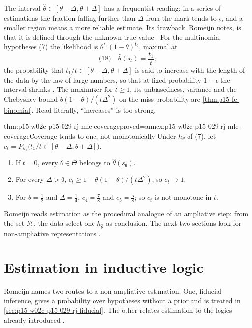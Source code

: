 The interval \(\hat\theta\in[\theta-\Delta,\theta+\Delta]\) has a
frequentist reading: in a series of estimations the fraction falling
further than \(\Delta\) from the mark tends to \(\epsilon\), and a
smaller region means a more reliable estimate. Its drawback, Romeijn
notes, is that it is defined through the unknown true value
\cite[p.~643]{Romeijn2011InductiveLogicStatistics}. For the multinomial
hypotheses (7) the likelihood is \(\theta^{t_1}(1-\theta)^{t_0}\),
maximal at
\[
 \text{(18)}\quad \hat\theta(s_t)=\frac{t_1}{t};
\]
the probability that \(t_1/t\in[\theta-\Delta,\theta+\Delta]\) is said
to increase with the length of the data by the law of large numbers, so
that at fixed probability \(1-\epsilon\) the interval shrinks
\cite[pp.~643--644]{Romeijn2011InductiveLogicStatistics}. The maximizer
for \(t\ge1\), its unbiasedness, variance and the Chebyshev bound
\(\theta(1-\theta)/(t\Delta^2)\) on the miss probability are
\cref{thm:p15-fe-binomial}. Read literally, ``increases'' is too
strong.

\begin{hbtheorem}{thm:p15-w02c-p15-029-rj-mle-coverage}{proved=annex:p15-w02c-p15-029-rj-mle-coverage}{Coverage tends to one, not monotonically}
Under \(h_\theta\) of (7), let
\(c_t=P_{h_\theta}\bigl(t_1/t\in[\theta-\Delta,\theta+\Delta]\bigr)\).
\begin{enumerate}
\item If \(t=0\), every \(\theta\in\Theta\) belongs to \(\hat\theta(s_0)\).
\item For every \(\Delta>0\), \(c_t\ge1-\theta(1-\theta)/(t\Delta^2)\),
  so \(c_t\to1\).
\item For \(\theta=\tfrac12\) and \(\Delta=\tfrac14\),
  \(c_4=\tfrac78\) and \(c_5=\tfrac58\); so \(c_t\) is not monotone in
  \(t\).
\end{enumerate}
\end{hbtheorem}

Romeijn reads estimation as the procedural analogue of an ampliative
step: from the set \(\mathcal H\), the data select one \(h_{\hat\theta}\)
as conclusion. The next two sections look for non-ampliative
representations \cite[p.~644]{Romeijn2011InductiveLogicStatistics}.

\section{Estimation in inductive logic}
\label{sec:p15-w02c-p15-029-rj-estimation}

Romeijn names two routes to a non-ampliative estimation. One, fiducial
inference, gives a probability over hypotheses without a prior and is
treated in \cref{sec:p15-w02c-p15-029-rj-fiducial}. The other relates
estimation to the logics already introduced
\cite[p.~644]{Romeijn2011InductiveLogicStatistics}.

